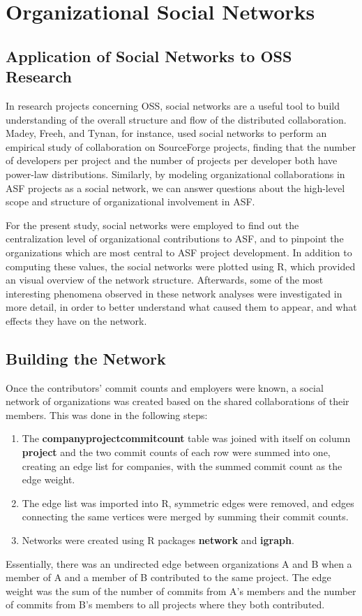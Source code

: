 \chapter{Organizational Social Networks}
\section{Application of Social Networks to OSS Research}
In research projects concerning OSS, social networks are a useful tool to build understanding of the overall structure and flow of the distributed collaboration. Madey, Freeh, and Tynan\cite{madey2002open}, for instance, used social networks to perform an empirical study of collaboration on SourceForge projects, finding that the number of developers per project and the number of projects per developer both have power-law distributions. Similarly, by modeling organizational collaborations in ASF projects as a social network, we can answer questions about the high-level scope and structure of organizational involvement in ASF.

For the present study, social networks were employed to find out the centralization level of organizational contributions to ASF, and to pinpoint the organizations which are most central to ASF project development. In addition to computing these values, the social networks were plotted using R, which provided an visual overview of the network structure. Afterwards, some of the most interesting phenomena observed in these network analyses were investigated in more detail, in order to better understand what caused them to appear, and what effects they have on the network.
\section{Building the Network}
Once the contributors' commit counts and employers were known, a social network of organizations was created based on the shared collaborations of their members. This was done in the following steps:
\begin{enumerate}
	\item The \textbf{companyprojectcommitcount} table was joined with itself on column \textbf{project} and the two commit counts of each row were summed into one, creating an edge list for companies, with the summed commit count as the edge weight.
	\item The edge list was imported into R, symmetric edges were removed, and edges connecting the same vertices were merged by summing their commit counts.
	\item Networks were created using R packages \textbf{network} and \textbf{igraph}.
\end{enumerate}
Essentially, there was an undirected edge between organizations A and B when a member of A and a member of B contributed to the same project. The edge weight was the sum of the number of commits from A's members and the number of commits from B's members to all projects where they both contributed.

